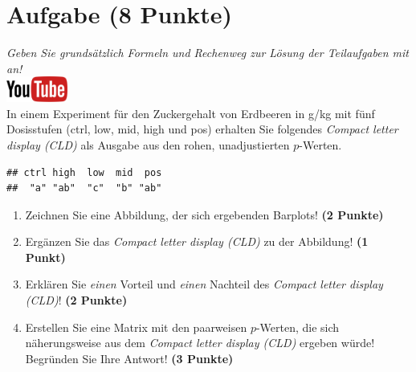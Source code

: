 \documentclass[a4paper, 9pt]{scrartcl}\usepackage[]{graphicx}\usepackage[]{xcolor}
\makeatletter
\newenvironment{kframe}{%
 \def\at@end@of@kframe{}%
 \ifinner\ifhmode%
  \def\at@end@of@kframe{\end{minipage}}%
  \begin{minipage}{\columnwidth}%
 \fi\fi%
 \def\FrameCommand##1{\hskip\@totalleftmargin \hskip-\fboxsep
 \colorbox{shadecolor}{##1}\hskip-\fboxsep
     \hskip-\linewidth \hskip-\@totalleftmargin \hskip\columnwidth}%
 \MakeFramed {\advance\hsize-\width
   \@totalleftmargin\z@ \linewidth\hsize
   \@setminipage}}%
 {\par\unskip\endMakeFramed%
 \at@end@of@kframe}
\newenvironment{knitrout}{}{} %
\makeatother
\begin{document}
\vspace{1Ex}

 
\clearpage

\section{Aufgabe \hfill (8 Punkte)}

\textit{Geben Sie grunds{\"a}tzlich Formeln und Rechenweg zur L{\"o}sung der
  Teilaufgaben mit an!} \\[1Ex]

 \hfill\href{https://youtu.be/xq29O8qDrg0}{\includegraphics[width =
   2cm]{img/youtube}}\\[1Ex]


 
 In einem Experiment f{\"u}r den Zuckergehalt von Erdbeeren in g/kg mit f{\"u}nf
 Dosisstufen (ctrl, low, mid, high und pos) erhalten Sie folgendes \textit{Compact
   letter display (CLD)} als \Rlogo Ausgabe aus den rohen, unadjustierten
 $p$-Werten.



\begin{knitrout}
\color{fgcolor}\begin{kframe}
\begin{verbatim}
## ctrl high  low  mid  pos 
##  "a" "ab"  "c"  "b" "ab"
\end{verbatim}
\end{kframe}
\end{knitrout}

\begin{enumerate}
\item Zeichnen Sie eine Abbildung, der sich ergebenden Barplots! \textbf{(2 Punkte)}
\item Erg{\"a}nzen Sie das \textit{Compact letter display (CLD)} zu der
  Abbildung! \textbf{(1 Punkt)}
\item Erkl{\"a}ren Sie \textit{einen} Vorteil und \textit{einen} Nachteil des
  \textit{Compact letter display (CLD)}! \textbf{(2 Punkte)}
\item Erstellen Sie eine Matrix mit den paarweisen $p$-Werten, die sich
  n{\"a}herungsweise aus dem \textit{Compact letter display (CLD)} ergeben w{\"u}rde! Begr{\"u}nden Sie Ihre Antwort! \textbf{(3 Punkte)}
\end{enumerate}
\end{document}
